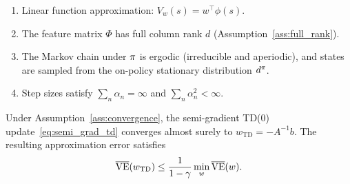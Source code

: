 \documentclass[11pt,a4paper]{article}
\begin{document}
\begin{assumption}
\label{ass:convergence}
\begin{enumerate}[nosep]
  \item Linear function approximation: $V_w(s) = w^\top \phi(s)$.
  \item The feature matrix $\Phi$ has full column rank $d$
    (Assumption~\ref{ass:full_rank}).
  \item The Markov chain under $\pi$ is ergodic (irreducible and
    aperiodic), and states are sampled from the on-policy stationary
    distribution $d^\pi$.
  \item Step sizes satisfy $\sum_n \alpha_n = \infty$ and
    $\sum_n \alpha_n^2 < \infty$.
\end{enumerate}
\end{assumption}

\begin{keyresult}[title={Convergence of Semi-Gradient TD(0) with Linear FA}]
\begin{theorem}
\label{thm:convergence}
Under Assumption~\ref{ass:convergence}, the semi-gradient TD(0)
update~\eqref{eq:semi_grad_td} converges almost surely to
$w_{\mathrm{TD}} = -A^{-1}b$. The resulting approximation error
satisfies
\begin{equation}
  \overline{\mathrm{VE}}(w_{\mathrm{TD}})
  \leq \frac{1}{1-\gamma}\min_w \overline{\mathrm{VE}}(w).
  \label{eq:td_error_bound}
\end{equation}
\end{theorem}
\end{keyresult}
\end{document}
